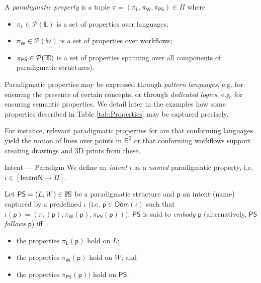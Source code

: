 \begin{Definition}
   A \emph{paradigmatic property} is a tuple 
$\pi = (\pi_{\mathsf{L}},\pi_{\mathsf{W}},\pi_{\mathsf{PS}}) \in \Pi$ where
\begin{itemize}
   \item $\pi_{\mathsf{L}} \in \mathcal{P}(\mathbb{L})$ is a set of properties 
over languages;
   \item $\pi_{\mathsf{W}} \in \mathcal{P}(\mathbb{W})$ is a set of properties 
over workflows;
   \item $\pi_{\mathsf{PS}}\in\mathcal{P}(\mathbb{P}\!\mathbb{S})$ is a set of 
properties spanning over all components of paradigmatic structures).
\end{itemize}
\end{Definition}
\noindent
Paradigmatic properties may be expressed through \emph{pattern languages}, e.g. 
for ensuring the presence of certain concepts, or through \emph{dedicated 
logics}, e.g. for ensuring semantic properties. We detail later in the examples 
how some properties described in Table \ref{tab:Properties} may be captured 
precisely.
\begin{newdef}
For instance, relevant paradigmatic properties for \CCAD are that conforming 
languages yield the notion of lines over points in $\mathbb{R^2}$ or that 
conforming workflows support creating drawings and 3D prints from these. 
\end{newdef}

\begin{Definition}{\label{def:Paradigm}Intent --- Paradigm}
   We define an \emph{intent} $\iota$ as a \emph{named} paradigmatic property, 
i.e. $\iota \in [\mathsf{IntentN} \to \Pi]$.

   Let $\mathsf{PS} = (L, W)\in\mathbb{P}\!\mathbb{S}$ be a paradigmatic structure and 
$\mathsf{p}$ an intent (name) captured by a predefined $\iota$ (i.e. 
$\mathsf{p}\in \mathsf{Dom}(\iota)$ such that 
$\iota(\mathsf{p}) = (\pi_{\mathsf{L}}(\mathsf{p}), 
                     \pi_{\mathsf{W}}(\mathsf{p}), 
                     \pi_{\mathsf{PS}}(\mathsf{p}))$). 
$\mathsf{PS}$ is said to \emph{embody} $\mathsf{p}$ (alternatively, 
$\mathsf{PS}$ \emph{follows} $\mathsf{p}$) iff 
\begin{itemize}
   \item the properties $\pi_{\mathsf{L}}(\mathsf{p})$ hold on $L$;
   \item the properties $\pi_{\mathsf{W}}(\mathsf{p})$ hold on $W$; and
   \item the properties $ \pi_{\mathsf{PS}}(\mathsf{p}))$ hold on $\mathsf{PS}$.
\end{itemize}
\end{Definition}

\begin{Example}
\end{Example}
